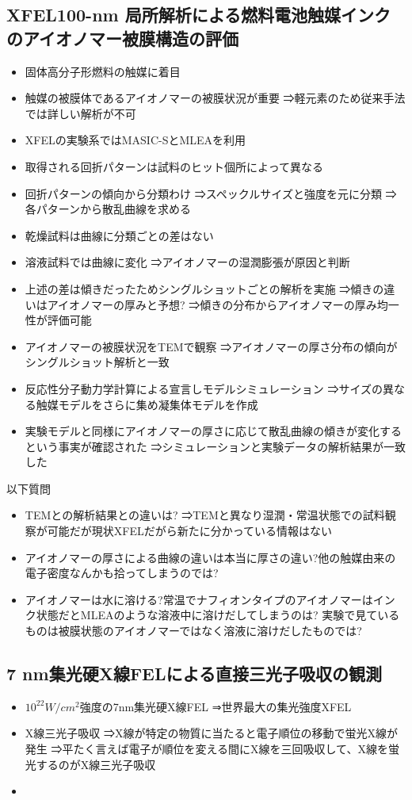 \documentclass[a4paper,12pt]{ltjsreport}
\newcommand{\con}[1]{\ensuremath{#1}}
\begin{document}
\subsection*{XFEL100-nm 局所解析による燃料電池触媒インクのアイオノマー被膜構造の評価}
\begin{itemize}
  \item 固体高分子形燃料の触媒に着目
  \item 触媒の被膜体であるアイオノマーの被膜状況が重要
        ⇒軽元素のため従来手法では詳しい解析が不可
  \item XFELの実験系ではMASIC-SとMLEAを利用
  \item 取得される回折パターンは試料のヒット個所によって異なる
  \item 回折パターンの傾向から分類わけ
        ⇒スペックルサイズと強度を元に分類
        ⇒各パターンから散乱曲線を求める
  \item 乾燥試料は曲線に分類ごとの差はない
  \item 溶液試料では曲線に変化
        ⇒アイオノマーの湿潤膨張が原因と判断
  \item 上述の差は傾きだったためシングルショットごとの解析を実施
        ⇒傾きの違いはアイオノマーの厚みと予想?
        ⇒傾きの分布からアイオノマーの厚み均一性が評価可能
  \item アイオノマーの被膜状況をTEMで観察
        ⇒アイオノマーの厚さ分布の傾向がシングルショット解析と一致
  \item 反応性分子動力学計算による宣言しモデルシミュレーション
        ⇒サイズの異なる触媒モデルをさらに集め凝集体モデルを作成
  \item 実験モデルと同様にアイオノマーの厚さに応じて散乱曲線の傾きが変化するという事実が確認された
        ⇒シミュレーションと実験データの解析結果が一致した
\end{itemize}
以下質問
\begin{itemize}
  \item TEMとの解析結果との違いは?
        ⇒TEMと異なり湿潤・常温状態での試料観察が可能だが現状XFELだがら新たに分かっている情報はない
  \item アイオノマーの厚さによる曲線の違いは本当に厚さの違い?他の触媒由来の電子密度なんかも拾ってしまうのでは?
  \item アイオノマーは水に溶ける?常温でナフィオンタイプのアイオノマーはインク状態だとMLEAのような溶液中に溶けだしてしまうのは?
        実験で見ているものは被膜状態のアイオノマーではなく溶液に溶けだしたものでは?
\end{itemize}
\subsection*{7 nm集光硬X線FELによる直接三光子吸収の観測}
\begin{itemize}
  \item \con{10^{22}W/cm^2}強度の7nm集光硬X線FEL
        ⇒世界最大の集光強度XFEL
  \item X線三光子吸収
        ⇒X線が特定の物質に当たると電子順位の移動で蛍光X線が発生
        ⇒平たく言えば電子が順位を変える間にX線を三回吸収して、X線を蛍光するのがX線三光子吸収
  \item
\end{itemize}
\end{document}
